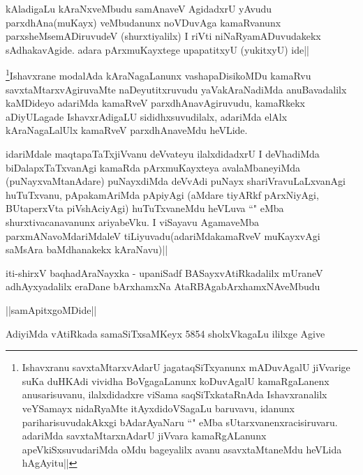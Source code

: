 \begin{artha}
kAladigaLu kAraNxveMbudu samAnaveV AgidadxrU yAvudu parxdhAna(muKayx) veMbudanunx noVDuvAga kamaRvanunx parxsheMsemADiruvudeV (shurxtiyalilx) I riVti niNaRyamADuvudakekx sAdhakavAgide. adara pArxmuKayxtege upapatitxyU (yukitxyU) ide||
\end{artha}


\begin{artha}
\footnote{Ishavxranu savxtaMtarxvAdarU jagataqSiTxyanunx mADuvAgalU jiVvarige suKa duHKAdi vividha BoVgagaLanunx koDuvAgalU kamaRgaLanenx anusarisuvanu, ilalxdidadxre viSama saqSiTxkataRnAda Ishavxranalilx veYSamayx nidaRyaMte itAyxdidoVSagaLu baruvavu, idanunx pariharisuvudakAkxgi bAdarAyaNaru ``\stext" eMba sUtarxvanenxracisiruvaru. adariMda savxtaMtarxnAdarU jiVvara kamaRgALanunx apeVkiSxsuvudariMda oMdu bageyalilx avanu asavxtaMtaneMdu heVLida hAgAyitu||}Ishavxrane modalAda kAraNagaLanunx vashapaDisikoMDu kamaRvu savxtaMtarxvAgiruvaMte naDeyutitxruvudu yaVakAraNadiMda anuBavadalilx kaMDideyo adariMda kamaRveV parxdhAnavAgiruvudu, kamaRkekx aDiyULagade IshavxrAdigaLU sididhxsuvudilalx, adariMda elAlx kAraNagaLalUlx kamaRveV parxdhAnaveMdu heVLide.
\end{artha}


\begin{artha}
idariMdale maqtapaTaTxjiVvanu deVvateyu ilalxdidadxrU I deVhadiMda biDalapxTaTxvanAgi kamaRda pArxmuKayxteya avalaMbaneyiMda (puNayxvaMtanAdare) puNayxdiMda deVvAdi puNayx shariVravuLaLxvanAgi huTuTxvanu, pApakamAriMda pApiyAgi (aMdare tiyARkf pArxNiyAgi, BUtaperxVta piVshAciyAgi) huTuTxvaneMdu heVLuva ``\stext" eMba shurxtivacanavanunx ariyabeVku. I viSayavu AgamaveMba parxmANavoMdariMdaleV tiLiyuvadu(adariMdakamaRveV muKayxvAgi saMsAra baMdhanakekx kAraNavu)||
\end{artha}

\begin{center}
iti-shirxV baqhadAraNayxka - upaniSadf BASayxvAtiRkadalilx mUraneV adhAyxyadalilx eraDane bArxhamxNa AtaRBAgabArxhamxNAveMbudu
\end{center}

\begin{center}
||samApitxgoMDide||
\end{center}

\begin{center}
AdiyiMda vAtiRkada samaSiTxsaMKeyx 5854 sholxVkagaLu ililxge Agive
\end{center}


